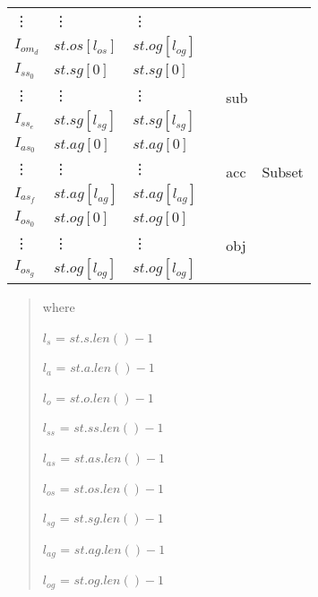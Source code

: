 \documentclass[10pt, twocolumn]{article}
\begin{document}
\begin{tabular}[t]{|l|l|l|l|l|l|}
            \vdots & \vdots & \vdots & & & \\
            $I_{om_{d}}$ & $st.os[l_{os}]$ & $st.og[l_{og}]$ & & & \\
            \hline
            $I_{ss_{0}}$ &
            $st.sg[0]$ &
            $st.sg[0]$ &
            &
            \multirow{3}{*}{\begin{sideways}sub\end{sideways}} &
            \multirow{9}{*}{\begin{sideways}Subset\end{sideways}} \\
            \vdots & \vdots & \vdots & & & \\
            $I_{ss_{e}}$ & $st.sg[l_{sg}]$ & $st.sg[l_{sg}]$ & & & \\
            \cline{1-5}
            $I_{as_{0}}$ &
            $st.ag[0]$ &
            $st.ag[0]$ &
            &
            \multirow{3}{*}{\begin{sideways}acc\end{sideways}} & \\
            \vdots & \vdots & \vdots & & & \\
            $I_{as_{f}}$ & $st.ag[l_{ag}]$ & $st.ag[l_{ag}]$ & & & \\
            \cline{1-5}
            $I_{os_{0}}$ &
            $st.og[0]$ &
            $st.og[0]$ &
            &
            \multirow{3}{*}{\begin{sideways}obj\end{sideways}} & \\
            \vdots & \vdots & \vdots & & & \\
            $I_{os_{g}}$ & $st.og[l_{og}]$ & $st.og[l_{og}]$ & & & \\
            \hline
          \end{tabular}

          \begin{quote}
            where

            $l_{s}$ = $st.s.len() - 1$

            $l_{a}$ = $st.a.len() - 1$

            $l_{o}$ = $st.o.len() - 1$

            $l_{ss}$ = $st.ss.len() - 1$

            $l_{as}$ = $st.as.len() - 1$

            $l_{os}$ = $st.os.len() - 1$

            $l_{sg}$ = $st.sg.len() - 1$

            $l_{ag}$ = $st.ag.len() - 1$

            $l_{og}$ = $st.og.len() - 1$
          \end{quote}
\end{document}
